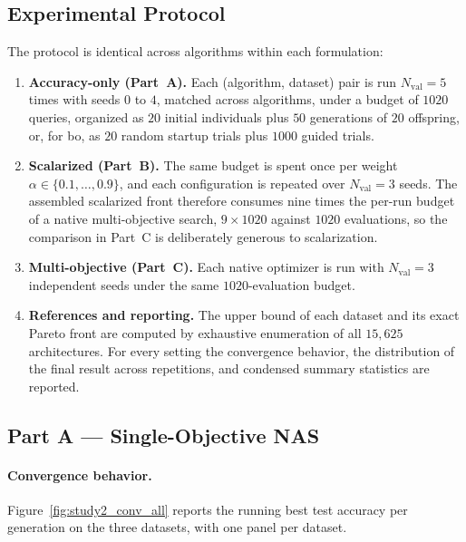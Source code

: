 \subsection{Experimental Protocol}
\label{subsec:study2_protocol}

The protocol is identical across algorithms within each formulation:

\begin{enumerate}
    \item \textbf{Accuracy-only (Part~A).} Each (algorithm, dataset) pair is run $N_{\mathrm{val}} = 5$ times with seeds $0$ to $4$, matched across algorithms, under a budget of $1020$ queries, organized as $20$ initial individuals plus $50$ generations of $20$ offspring, or, for \acrshort{bo}, as $20$ random startup trials plus $1000$ guided trials.

    \item \textbf{Scalarized (Part~B).} The same budget is spent once per weight $\alpha \in \{0.1, \dots, 0.9\}$, and each configuration is repeated over $N_{\mathrm{val}} = 3$ seeds. The assembled scalarized front therefore consumes nine times the per-run budget of a native multi-objective search, $9 \times 1020$ against $1020$ evaluations, so the comparison in Part~C is deliberately generous to scalarization.

    \item \textbf{Multi-objective (Part~C).} Each native optimizer is run with $N_{\mathrm{val}} = 3$ independent seeds under the same $1020$-evaluation budget.

    \item \textbf{References and reporting.} The upper bound of each dataset and its exact Pareto front are computed by exhaustive enumeration of all $15{,}625$ architectures. For every setting the convergence behavior, the distribution of the final result across repetitions, and condensed summary statistics are reported.
\end{enumerate}

\subsection{Part A --- Single-Objective NAS}
\label{subsec:study2_single_objective}

\paragraph{Convergence behavior.}
Figure~\ref{fig:study2_conv_all} reports the running best test accuracy per generation on the three datasets, with one panel per dataset.

